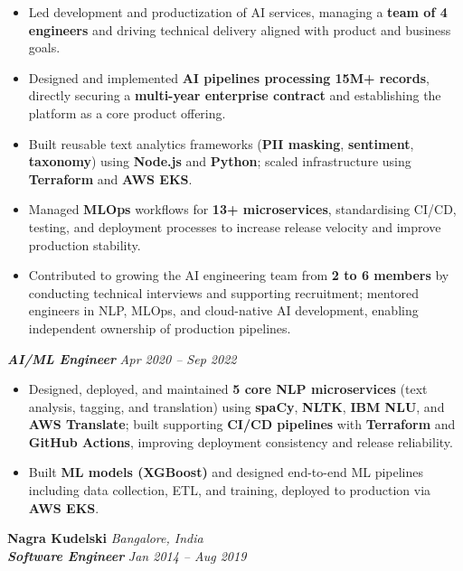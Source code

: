 \documentclass[10pt,a4paper]{article}
\begin{document}
\begin{itemize}[leftmargin=1.2em, label=\textopenbullet]
  \item Led development and productization of AI services, managing a \textbf{team of 4 engineers} and driving technical delivery aligned with product and business goals.
  \item Designed and implemented \textbf{AI pipelines processing 15M+ records}, directly securing a \textbf{multi-year enterprise contract} and establishing the platform as a core product offering.
  \item Built reusable text analytics frameworks (\textbf{PII masking}, \textbf{sentiment}, \textbf{taxonomy}) using \textbf{Node.js} and \textbf{Python}; scaled infrastructure using \textbf{Terraform} and \textbf{AWS EKS}.
  \item Managed \textbf{MLOps} workflows for \textbf{13+ microservices}, standardising CI/CD, testing, and deployment processes to increase release velocity and improve production stability.
  \item Contributed to growing the AI engineering team from \textbf{2 to 6 members} by conducting technical interviews and supporting recruitment; mentored engineers in NLP, MLOps, and cloud-native AI development, enabling independent ownership of production pipelines.
\end{itemize}

\vspace{3pt}
\noindent\textit{\textbf{AI/ML Engineer}} \hfill \textit{Apr 2020 -- Sep 2022}

\begin{itemize}[leftmargin=1.2em, label=\textopenbullet]
  \item Designed, deployed, and maintained \textbf{5 core NLP microservices} (text analysis, tagging, and translation) using \textbf{spaCy}, \textbf{NLTK}, \textbf{IBM NLU}, and \textbf{AWS Translate}; built supporting \textbf{CI/CD pipelines} with \textbf{Terraform} and \textbf{GitHub Actions}, improving deployment consistency and release reliability.
  \item Built \textbf{ML models (XGBoost)} and designed end-to-end ML pipelines including data collection, ETL, and training, deployed to production via \textbf{AWS EKS}.
\end{itemize}

\vspace{3pt}
\noindent\textbf{Nagra Kudelski} \hfill \textit{Bangalore, India} \\
\textit{\textbf{Software Engineer}} \hfill \textit{Jan 2014 -- Aug 2019}
\end{document}
